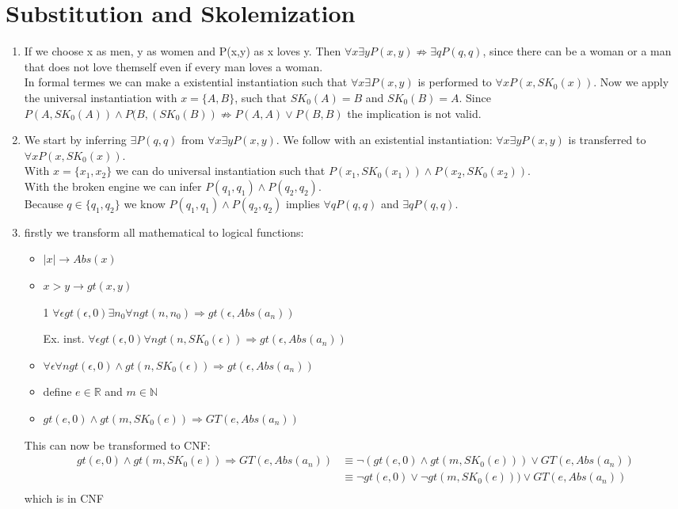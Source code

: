 \documentclass[a4paper]{article}
\begin{document}
\section{Substitution and Skolemization}
\begin{enumerate}
	\item If we choose x as men, y as women and P(x,y) as x loves y. Then $\forall x \exists y P(x,y) \not \Rightarrow \exists q P(q,q)$, since there can be a woman or a man that does not love themself even if every man loves a woman. \\
	In formal termes we can make a existential instantiation such that $\forall x \exists P(x,y)$ is performed to $\forall x P(x, SK_0(x))$. Now we apply the universal instantiation with $x= \{A,B\}$, such that $SK_0(A) = B$ and $SK_0(B) = A$. Since $P(A,SK_0(A)) \land P(B,(SK_0(B)) \not \Rightarrow P(A,A) \lor P(B,B)$ the implication is not valid.
	\item 
	We start by inferring $\exists P(q,q)$ from $\forall x\exists y P(x,y)$. We follow with an existential instantiation: $\forall x \exists y P(x,y)$ is transferred to  $\forall x P(x, SK_0(x))$.\\
	With $x = \{x_1,x_2\}$ we can do universal instantiation such that $P(x_1, SK_0(x_1)) \land P(x_2, SK_0(x_2))$.\\
	With the broken engine we can infer $P(q_1,q_1) \land P(q_2,q_2)$.\\
	Because $q \in \{q_1,q_2\}$ we know $P(q_1,q_1) \land P(q_2,q_2)$ implies $\forall q P(q,q)$ and $\exists q P(q,q)$.
	\item 
	firstly we transform all mathematical to logical functions:
	\begin{itemize}
		\item $|x| \rightarrow Abs(x)$
		\item $ x > y \rightarrow gt(x,y)$
		\item[1] $\forall \epsilon gt(\epsilon,0) \exists n_0 \forall n gt(n,n_0) \Rightarrow gt(\epsilon, Abs(a_n))$
		\item[Ex. inst.] $\forall \epsilon gt(\epsilon,0) \forall n gt(n,SK_0(\epsilon)) \Rightarrow gt(\epsilon, Abs(a_n))$ 
		\item $\forall \epsilon \forall n gt(\epsilon,0) \land gt(n,SK_0(\epsilon)) \Rightarrow gt(\epsilon, Abs(a_n))$ 
		\item define $e \in \mathbb{R}$ and $m \in \mathbb{N}$
		\item $gt(e,0) \land gt(m, SK_0(e)) \Rightarrow GT(e, Abs(a_n))$
	\end{itemize}
	This can now be transformed to CNF:
	\begin{align*}
		gt(e,0) \land gt(m, SK_0(e)) \Rightarrow GT(e, Abs(a_n)) 
		&\equiv \neg (gt(e,0) \land gt(m, SK_0(e))) \lor GT(e, Abs(a_n))\\
		&\equiv \neg gt(e,0) \lor \neg gt(m, SK_0(e))) \lor GT(e, Abs(a_n))\\
	\end{align*}
	which is in CNF
\end{enumerate}
\end{document}
